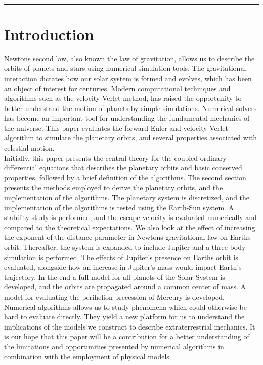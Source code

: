 \documentclass[%
reprint,nofootinbib,
amsmath,amssymb,
aps,
]{revtex4-1}
\newcommand{\HRule}{\rule{\textwidth}{0.5mm}}
\begin{document}
\noindent 
\vspace{1mm}  \\
\HRule
\vspace{0.1cm}


\section{Introduction} 
\twocolumngrid
\noindent Newtons second law, also known the law of gravitation, allows us to describe the orbits of planets and stars using numerical simulation tools. The gravitational interaction dictates how our solar system is formed and evolves, which has been an object of interest for centuries. Modern computational techniques and algorithms such as the velocity Verlet method, has raised the opportunity to better understand the motion of planets by simple simulations. Numerical solvers has become an important tool for understanding the fundamental mechanics of the universe. This paper evaluates the forward Euler and velocity Verlet algorithm to simulate the planetary orbits, and several properties associated with celestial motion. \\ \indent
Initially, this paper presents the central theory for the coupled ordinary differential equations that describes the planetary orbits and basic conserved properties, followed by a brief definition of the algorithms. The second section presents the methods employed to derive the planetary orbits, and the implementation of the algorithms. The planetary system is discretized, and the implementation of the algorithms is tested using the Earth-Sun system. A stability study is performed, and the escape velocity is evaluated numerically and compared to the theoretical expectations. We also look at the effect of increasing the exponent of the distance parameter in Newtons gravitational law on Earths orbit. Thereafter, the system is expanded to include Jupiter and a three-body simulation is performed. The effects of Jupiter's presence on Earths orbit is evaluated, alongside how an increase in Jupiter's mass would impact Earth's trajectory. In the end a full model for all planets of the Solar System is developed, and the orbits are propagated around a common center of mass. A model for evaluating the perihelion precession of Mercury is developed.\\ \indent 
Numerical algorithms allows us to study phenomena which could otherwise be hard to evaluate directly. They yield a new platform for us to understand the implications of the models we construct to describe extraterrestrial mechanics. It is our hope that this paper will be a contribution for a better understanding of the limitations and opportunities presented by numerical algorithms in combination with the employment of physical models. 
\newpage
\end{document}
